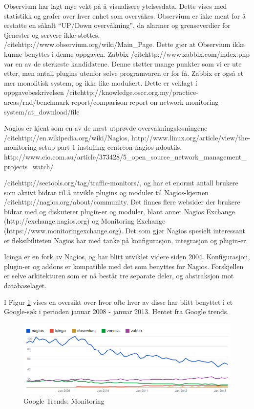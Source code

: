 Observium har lagt mye vekt på å visualisere ytelsesdata. Dette vises med statistikk og grafer over hver enhet som overvåkes. Observium er ikke ment for å erstatte en såkalt “UP/Down overvåkning”, da alarmer og grenseverdier for tjenester og servere ikke støttes. /cite{http://www.observium.org/wiki/Main\_Page}. Dette gjør at Observium ikke kunne benyttes i denne oppgaven.
Zabbix /cite{http://www.zabbix.com/index.php} var en av de sterkeste kandidatene. Denne støtter mange punkter som vi er ute etter, men antall plugins utenfor selve programvaren er for få. Zabbix er også et mer monolitisk system, og ikke like modulært. Dette er veklagt i oppgavebeskrivelsen /cite{http://knowledge.oscc.org.my/practice-areas/rnd/benchmark-report/comparison-report-on-network-monitoring-system/at\_download/file}

Nagios er kjent som en av de mest utprøvde overvåkningsløsningene /cite{http://en.wikipedia.org/wiki/Nagios, http://www.linux.org/article/view/the-monitoring-setup-part-1-installing-centreon-nagios-ndoutils, http://www.cio.com.au/article/373428/5\_open\_source\_network\_management\_projects\_watch/}

/cite{http://sectools.org/tag/traffic-monitors/}, og har et enormt antall brukere som aktivt bidrar til å utvikle plugins og moduler til Nagios-kjernen /cite{http://nagios.org/about/community}. Det finnes flere websider der brukere bidrar med og diskuterer plugin-er og moduler, blant annet Nagios Exchange (http://exchange.nagios.org) og Monitoring Exchange (https://www.monitoringexchange.org). Det som gjør Nagios spesielt interessant er fleksibiliteten Nagios har med tanke på konfigurasjon, integrasjon og plugin-er.

Icinga er en fork av Nagios, og har blitt utviklet videre siden 2004. Konfigurasjon, plugin-er og addons er kompatible med det som benyttes for Nagios. Forskjellen er selve arkitekturen som er nå består tre separate deler, og abstraksjon mot databaselaget. 

I Figur \ref{losninger} vises en oversikt over hvor ofte hver av disse har blitt benyttet i et Google-søk i perioden januar 2008 - januar 2013. Hentet fra Google trends.

\begin{center}
\begin{figure}
    \includegraphics{img/monitoring_google_trends}
    \caption{Google Trends: Monitoring}
    \label{losninger}
\end{figure}
\end{center}

